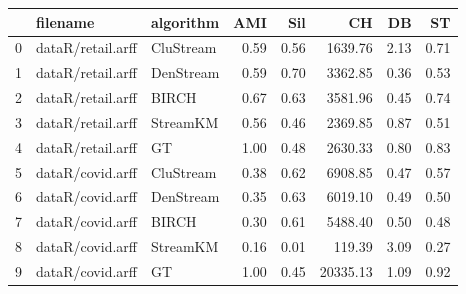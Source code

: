 \begin{tabular}{lllrrrrr}
\toprule
{} &           filename &  algorithm &  AMI &  Sil &       CH &   DB &   ST \\
\midrule
0 &  dataR/retail.arff &  CluStream & 0.59 & 0.56 &  1639.76 & 2.13 & 0.71 \\
1 &  dataR/retail.arff &  DenStream & 0.59 & 0.70 &  3362.85 & 0.36 & 0.53 \\
2 &  dataR/retail.arff &      BIRCH & 0.67 & 0.63 &  3581.96 & 0.45 & 0.74 \\
3 &  dataR/retail.arff &   StreamKM & 0.56 & 0.46 &  2369.85 & 0.87 & 0.51 \\
4 &  dataR/retail.arff &         GT & 1.00 & 0.48 &  2630.33 & 0.80 & 0.83 \\
5 &   dataR/covid.arff &  CluStream & 0.38 & 0.62 &  6908.85 & 0.47 & 0.57 \\
6 &   dataR/covid.arff &  DenStream & 0.35 & 0.63 &  6019.10 & 0.49 & 0.50 \\
7 &   dataR/covid.arff &      BIRCH & 0.30 & 0.61 &  5488.40 & 0.50 & 0.48 \\
8 &   dataR/covid.arff &   StreamKM & 0.16 & 0.01 &   119.39 & 3.09 & 0.27 \\
9 &   dataR/covid.arff &         GT & 1.00 & 0.45 & 20335.13 & 1.09 & 0.92 \\
\bottomrule
\end{tabular}
